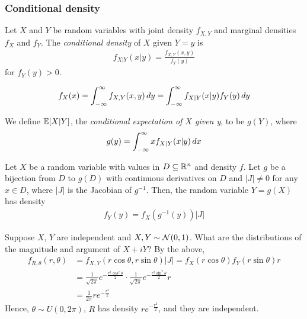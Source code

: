\documentclass{../template/note}
\begin{document}
    \subsubsection{Conditional density}

    \begin{definition}
        Let \(X\) and \(Y\) be random variables with joint density \(f_{X, Y}\) and marginal densities \(f_X\) and \(f_Y\). The \emph{conditional density} of \(X\) given \(Y=y\) is
        \begin{align*}
            f_{X | Y}(x | y) = \frac{f_{X, Y}(x, y)}{f_Y(y)}
        \end{align*}
        for \(f_Y(y) > 0\).
    \end{definition}
    
    \begin{proposition}
        \[
            f_X(x) = \int_{-\infty}^\infty f_{X,Y}(x, y) \,d{y} = \int_{-\infty}^\infty f_{X | Y}(x | y)f_Y(y) \,d{y}
        \]
    \end{proposition}
    
    \begin{definition}
        We define \(\mathbb E[X | Y]\), the \emph{conditional expectation of \(X\) given y}, to be \(g(Y)\), where
        \begin{align*}
            g(y) = \int_{-\infty}^\infty x f_{X | Y}(x | y) \,d{x}
        \end{align*}
    \end{definition}
    
    \begin{theorem}
        \label{functions-multivariate}
        Let \(X\) be a random variable with values in \(D \subseteq \mathbb R^n\) and density \(f\). Let \(g\) be a bijection from \(D\) to \(g(D)\) with continuous derivatives on \(D\) and \(|J| \neq 0\) for any \(x \in D\), where \(|J|\) is the Jacobian of \(g^{-1}\). Then, the random variable \(Y = g(X)\) has density
        \begin{align*}
            f_Y(y) = f_X\left(g^{-1}(y)\right) |J|
        \end{align*}  
    \end{theorem}
    
    \begin{example*}
        Suppose \(X\), \(Y\) are independent and \(X, Y \sim \mathcal{N}(0, 1)\). What are the distributions of the magnitude and argument of \(X+iY\)? By the above,
        \begin{align*}
            f_{R, \theta}(r, \theta) &= f_{X, Y}(r \cos \theta, r \sin \theta) |J| = f_X(r \cos \theta)f_Y(r \sin \theta)r \\
            &= \frac 1 {\sqrt{2\pi}} e^{-\frac{r^2\cos^2\theta}2} \cdot \frac 1 {\sqrt{2\pi}} e^{-\frac{r^2\sin^2\theta}2} r \\
            &= \frac 1 {2\pi} re^{-\frac{r^2}2}
        \end{align*}
        Hence, \(\theta \sim U(0, 2\pi)\), \(R\) has density \(re^{-\frac{r^2}2}\), and they are independent.        
    \end{example*}
\end{document}
